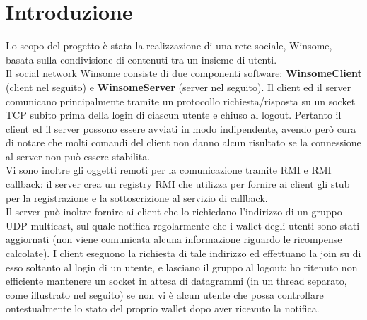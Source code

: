 \documentclass[a4paper,11pt]{article}
\begin{document}
	\section{Introduzione}
	Lo scopo del progetto è stata la realizzazione di una rete sociale, Winsome, basata sulla condivisione	di contenuti tra un insieme di utenti. \\
	Il social network Winsome consiste di due componenti software: \textbf{WinsomeClient} (client nel seguito)
	e \textbf{WinsomeServer} (server nel seguito). Il client ed il server comunicano principalmente tramite un 
	protocollo richiesta/risposta su un socket TCP subito prima della login di ciascun utente e chiuso al logout. Pertanto il client ed il server possono essere avviati in modo indipendente, avendo però cura di notare che molti comandi del client non
	danno alcun risultato se la connessione al server non può essere stabilita.\\
	Vi sono inoltre gli oggetti remoti per la comunicazione tramite RMI e RMI callback: il server crea un registry RMI che utilizza per fornire ai client gli stub per la registrazione e la sottoscrizione al servizio di callback.\\
	Il server può inoltre fornire ai client che lo richiedano l'indirizzo di un gruppo UDP multicast, sul quale notifica regolarmente che i wallet degli utenti sono stati
	aggiornati (non viene comunicata alcuna informazione riguardo le ricompense calcolate). I client eseguono la richiesta di tale indirizzo ed effettuano la join
	su di esso soltanto al login di un utente, e lasciano il gruppo al logout: ho ritenuto non efficiente mantenere un socket in attesa di datagrammi (in un thread separato, come illustrato nel seguito) se non vi è alcun utente che possa controllare ontestualmente lo stato del proprio wallet dopo aver ricevuto la notifica.\\
	
\end{document}
